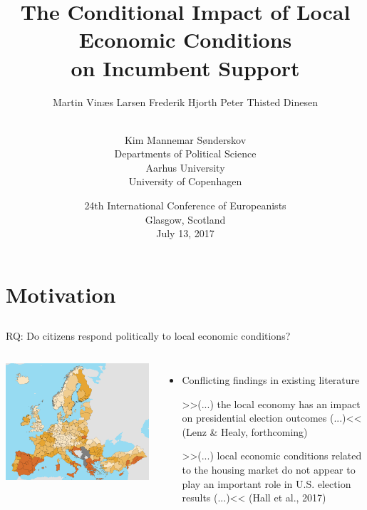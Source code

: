 \documentclass[10pt,aspectratio=169,handout]{beamer}
\title[Conditional Impact]{The Conditional Impact of Local Economic Conditions \\ on Incumbent Support}
\author[Larsen et al.]{Martin Vin\ae s Larsen \qquad Frederik Hjorth \qquad Peter Thisted  Dinesen  \and  \\ Kim Mannemar  S\o nderskov \vspace{0.1in}  \\Departments of Political Science \\ Aarhus University \\ University of Copenhagen }
\date[July 13, 2017]{24th International Conference of Europeanists \\ Glasgow, Scotland \\ July 13, 2017}
\begin{document}
	
\begin{frame}
\titlepage
\end{frame}

\begin{frame}
\end{frame}

\section{Motivation}
\subsection{}
\begin{frame}

RQ: Do citizens respond politically to local economic conditions? 
\begin{columns}
	\includegraphics[width=0.99\textwidth]{../../figures/eurostat}
	\begin{itemize}[<+->]
		\item Conflicting findings in existing literature
		\begin{block}{}
			>>(...) the local economy \alert{has an impact} on presidential election outcomes (...)<< (Lenz \& Healy, forthcoming)
		\end{block} \pause
		\begin{block}{}
			>>(...) local economic conditions related to the housing market \alert{do not appear to play an important role} in U.S. election results (...)<< (Hall et al., 2017) \pause
		\end{block}
	\end{itemize}
\end{columns}

\end{frame}
\end{document}
